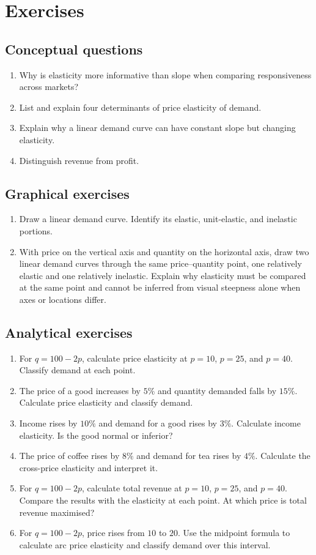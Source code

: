 \section*{Exercises}

\subsection*{Conceptual questions}
\begin{enumerate}[label=\arabic*.]
  \item Why is elasticity more informative than slope when comparing responsiveness across markets?
  \item List and explain four determinants of price elasticity of demand.
  \item Explain why a linear demand curve can have constant slope but changing elasticity.
  \item Distinguish revenue from profit.
\end{enumerate}

\subsection*{Graphical exercises}
\begin{enumerate}[resume,label=\arabic*.]
  \item Draw a linear demand curve. Identify its elastic, unit-elastic, and inelastic portions.
  \item With price on the vertical axis and quantity on the horizontal axis, draw two linear demand curves through the same price--quantity point, one relatively elastic and one relatively inelastic. Explain why elasticity must be compared at the same point and cannot be inferred from visual steepness alone when axes or locations differ.
\end{enumerate}

\subsection*{Analytical exercises}
\begin{enumerate}[resume,label=\arabic*.]
  \item For $q=100-2p$, calculate price elasticity at $p=10$, $p=25$, and $p=40$. Classify demand at each point.
  \item The price of a good increases by $5\%$ and quantity demanded falls by $15\%$. Calculate price elasticity and classify demand.
  \item Income rises by $10\%$ and demand for a good rises by $3\%$. Calculate income elasticity. Is the good normal or inferior?
  \item The price of coffee rises by $8\%$ and demand for tea rises by $4\%$. Calculate the cross-price elasticity and interpret it.
  \item For $q=100-2p$, calculate total revenue at $p=10$, $p=25$, and $p=40$. Compare the results with the elasticity at each point. At which price is total revenue maximised?
  \item For $q=100-2p$, price rises from $10$ to $20$. Use the midpoint formula to calculate arc price elasticity and classify demand over this interval.
\end{enumerate}

